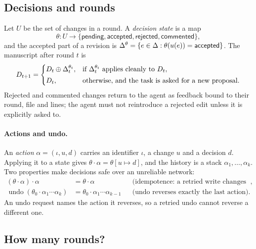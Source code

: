\subsection{Decisions and rounds}

Let $U$ be the set of changes in a round. A \emph{decision state} is a map
\begin{equation}
  \theta : U \to \{\textsf{pending}, \textsf{accepted}, \textsf{rejected},
  \textsf{commented}\},
\end{equation}
and the accepted part of a revision is
$\Delta^{\theta} = \{ e \in \Delta : \theta(u(e)) = \textsf{accepted} \}$.
The manuscript after round $t$ is
\begin{equation}
  D_{t+1} =
  \begin{cases}
    D_t \oplus \Delta_t^{\theta_t}, & \text{if } \Delta_t^{\theta_t}
      \text{ applies cleanly to } D_t,\\[2pt]
    D_t, & \text{otherwise, and the task is asked for a new proposal.}
  \end{cases}
  \label{eq:round}
\end{equation}
Rejected and commented changes return to the agent as feedback bound to their
round, file and lines; the agent must not reintroduce a rejected edit unless it
is explicitly asked to.

\paragraph{Actions and undo.}
An \emph{action} $\alpha = (\iota, u, d)$ carries an identifier $\iota$, a
change $u$ and a decision $d$. Applying it to a state gives
$\theta \cdot \alpha = \theta[u \mapsto d]$, and the history is a stack
$\alpha_1, \dots, \alpha_k$. Two properties make decisions safe over an
unreliable network:
\begin{align}
  (\theta \cdot \alpha) \cdot \alpha &= \theta \cdot \alpha
    && \text{(idempotence: a retried write changes nothing)},
    \label{eq:idempotent}\\
  \operatorname{undo}(\theta_0 \cdot \alpha_1 \cdots \alpha_k)
    &= \theta_0 \cdot \alpha_1 \cdots \alpha_{k-1}
    && \text{(undo reverses exactly the last action)}.
    \label{eq:undo}
\end{align}
An undo request names the action it reverses, so a retried undo cannot reverse
a different one.

\subsection{How many rounds?}

